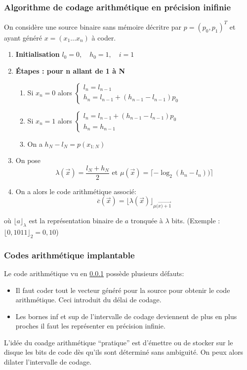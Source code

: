 \documentclass[main.tex]{subfiles}
\begin{document}
\subsubsection{Algorithme de codage arithmétique en précision inifinie}\label{sec:arithm}

On considère une source binaire sans mémoire décritre par $p=(p_0,p_1)^T$ et ayant généré $x = (x_1 ... x_n)$ à coder.

\begin{enumerate}
\item \textbf{Initialisation} $l_0=0, \quad h_0 = 1,\quad i=1$

\item \textbf{Étapes : pour n allant de 1 à N}
\begin{enumerate}
\item Si $x_n=0$ alors $  \begin{cases}
l_n=l_{n-1} \\
h_n=l_{n-1}+(h_{n-1}-l_{n-1})p_0
\end{cases}$

\item Si $x_n=1$ alors $
  \begin{cases}
    l_n=l_{n-1}+(h_{n-1}-l_{n-1})p_0 \\ h_n=h_{n-1}
\end{cases}
$

\item On a $h_N-l_N=p(x_{1:N})$
\end{enumerate}

\item On pose \[
    \lambda(\vec{x}) = \frac{l_N+h_N}{2} \text{ et } \mu(\vec{x}) = \lceil-\log_2(h_n-l_n))\rceil\]
\item On a alors le code arithmétique associé:
\[ \overline{c}(\vec{x}) = \lfloor \lambda(\vec{x}) \rfloor _{\mu(\vec{x)+1}} \]
\end{enumerate}
où $\lfloor a \rfloor _{\lambda}$ est la représentation binaire de $a$ tronquée à $\lambda$ bits. (Exemple : $\lfloor 0,1011 \rfloor _2 = 0,10$)\\

\subsubsection{Codes arithmétique implantable}

Le code arithmétique vu en \ref{sec:arithm} possède plusieurs défauts:
\begin{itemize}
\item Il faut coder tout le vecteur généré pour la source pour obtenir le code arithmétique. Ceci introduit du délai de codage.
\item Les bornes inf et sup de l'intervalle de codage deviennent de plus en plus proches il faut les représenter en précision infinie.
\end{itemize}
L'idée du coadge arithmétique ``pratique'' est d'émettre ou de stocker sur le disque les bits de code dès qu'ils sont déterminé sans ambiguité. On peux alors dilater l'intervalle de codage.
\end{document}
